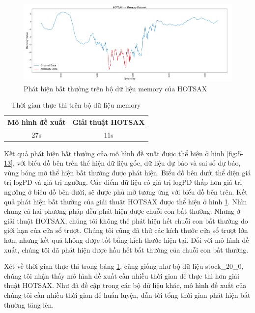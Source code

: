 \begin{figure}[H]
    \centering
    \includegraphics[scale=0.75]{./content/images/5-14.png}
    \caption{Phát hiện bất thường trên bộ dữ liệu memory của HOTSAX}
    \label{fig:5-14}
\end{figure}

\begin{table}[H]
\centering
\begin{tabular}{|c|c|}
\hline
\textbf{Mô hình đề xuất} & \textbf{Giải thuật HOTSAX}  \\
\hline
27s                       & 11s                     \\
\hline
\end{tabular}
\caption{Thời gian thực thi trên bộ dữ liệu memory}
\label{tab:5-7}
\end{table}

Kết quả phát hiện bất thường của mô hình đề xuất được thể hiện ở hình \ref{fig:5-13}, với biểu đồ bên trên thể hiện dữ liệu gốc, dữ liệu dự báo và sai số dự báo, vùng bóng mờ thể hiện bất thường được phát hiện. Biểu đồ bên dưới thể diện giá trị logPD và giá trị ngưỡng. Các điểm dữ liệu có giá trị logPD thấp hơn giá trị ngưỡng ở biểu đồ bên dưới, sẽ được phủ mờ tương ứng với biểu đồ bên trên. Kết quả phát hiện bất thường của giải thuật HOTSAX được thể hiện ở hình \ref{fig:5-14}. Nhìn chung cả hai phương pháp đều phát hiện được chuỗi con bất thường. Nhưng ở giải thuật HOTSAX, chúng tôi không thể phát hiện hết chuỗi con bất thường do giới hạn của cửa sổ trượt. Chúng tôi cũng đã thử các kích thước cửa sổ trượt lớn hơn, nhưng kết quả không được tốt bằng kích thước hiện tại. Đối với mô hình đề xuất, chúng tôi đã phát hiện được hầu hết bất thường của chuỗi con bất thường.

Xét về thời gian thực thi trong bảng \ref{tab:5-7}, cũng giống như bộ dữ liệu stock\_20\_0, chúng tôi nhận thấy mô hình đề xuất cần nhiều thời gian để thực thi hơn giải thuật HOTSAX. Như đã đề cập trong các bộ dữ liệu khác, mô hình đề xuất của chúng tôi cần nhiều thời gian để huấn luyện, dẫn tới tổng thời gian phát hiện bất thường tăng lên.

